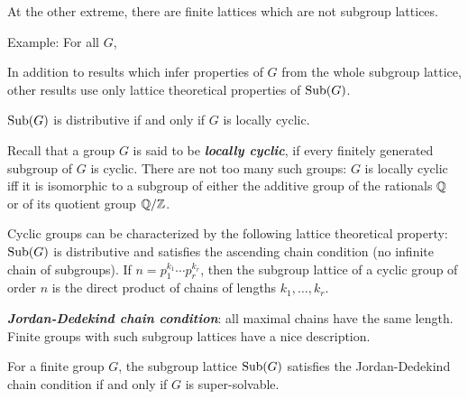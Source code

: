 \documentclass[xcolor=dvipsnames,11pt,hide notes]{beamer}
\newcommand{\defn}[1]{\textcolor{olivegreen}{\textit{\textbf{#1}}}}
\theoremstyle{definition}
\theoremstyle{remark}
\numberwithin{theorem}{section}
\numberwithin{claim}{section}
\numberwithin{equation}{section}
\numberwithin{conjecture}{section}
\begin{document}
\begin{frame}[fragile,label=Motivation]{}
At the other extreme, there are finite lattices which are not subgroup lattices.

\vskip6mm

\alert{Example:} For all $G$,
\vskip1mm  \hskip25mm
\end{frame}

\begin{frame}[fragile,label=Ore]{}
In addition to results which infer properties of $G$ from the
whole subgroup lattice, other results use only lattice
theoretical properties of $\mathrm{Sub}(G)$.
\vskip4mm
\begin{theorem}[Ore, 1937] 
$\mathrm{Sub}(G)$ is distributive if and only if $G$ is locally cyclic.
\end{theorem}
\end{frame}
\begin{frame}[fragile,label=Ore]{}
Recall that a group $G$ is said to be \defn{locally cyclic}, if every finitely
generated subgroup of $G$ is cyclic. 
\vskip4mm
There are not too many such groups: $G$ is locally
cyclic iff it is isomorphic to a subgroup of either the additive group of
the rationals $\mathbb{Q}$ or of its quotient group $\mathbb{Q}/\mathbb{Z}$.
\end{frame}
\begin{frame}[fragile,label=Ore]{}
Cyclic groups can be characterized by the following lattice theoretical
property: $\mathrm{Sub}(G)$ is distributive
and satisfies the ascending chain condition (no infinite chain of subgroups).
\vskip4mm
If $n = p_1^{k_1}\cdots p_r^{k_r}$, then the subgroup lattice of
a cyclic group of order $n$ is the direct product of chains of lengths $k_1,
\dots, k_r$.
\end{frame}
\begin{frame}[fragile,label=Iwasawa]{}
\defn{Jordan-Dedekind chain condition}: all maximal chains
have the same length. Finite groups with such subgroup lattices have a
nice description.
\vskip4mm
\begin{theorem}[Iwasawa, 1941]
For a finite group $G$, the subgroup lattice
$\mathrm{Sub}(G)$ satisfies the Jordan-Dedekind chain condition if and only if $G$ is
super-solvable.
\end{theorem}
\end{frame}
\end{document}
